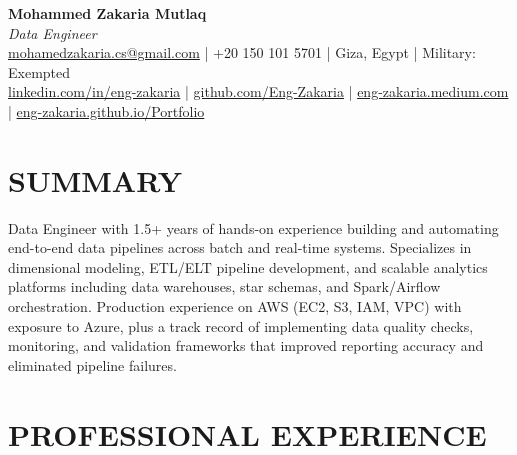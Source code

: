 \documentclass[10pt,letterpaper]{article}
\newcommand{\resumeSection}[1]{\section{\texorpdfstring{\MakeUppercase{#1}}{#1}}}
\begin{document}
\begin{center}
{\LARGE \textbf{Mohammed Zakaria Mutlaq}}\\[3pt]
\textit{Data Engineer}\\[3pt]
\small
\href{mailto:mohamedzakaria.cs@gmail.com}{mohamedzakaria.cs@gmail.com} \enspace|\enspace
+20 150 101 5701 \enspace|\enspace
Giza, Egypt \enspace|\enspace
Military: Exempted\\[2pt]
\href{https://linkedin.com/in/eng-zakaria}{linkedin.com/in/eng-zakaria} \enspace|\enspace
\href{https://github.com/Eng-Zakaria}{github.com/Eng-Zakaria} \enspace|\enspace
\href{https://eng-zakaria.medium.com}{eng-zakaria.medium.com} \enspace|\enspace
\href{https://eng-zakaria.github.io/Portfolio}{eng-zakaria.github.io/Portfolio}
\end{center}

\resumeSection{Summary}
\small
Data Engineer with 1.5+ years of hands-on experience building and automating end-to-end data pipelines across batch and real-time systems. Specializes in dimensional modeling, ETL/ELT pipeline development, and scalable analytics platforms including data warehouses, star schemas, and Spark/Airflow orchestration. Production experience on AWS (EC2, S3, IAM, VPC) with exposure to Azure, plus a track record of implementing data quality checks, monitoring, and validation frameworks that improved reporting accuracy and eliminated pipeline failures.

\resumeSection{Professional Experience}
\end{document}
